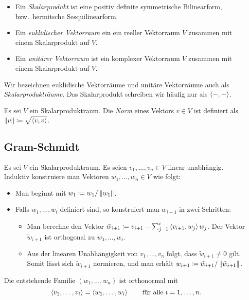 \begin{definition}
  \begin{itemize}
    \item
      Ein \emph{Skalarprodukt} ist eine positiv definite symmetrische Bilinearform, bzw.\ hermitsche Sesquilinearform.
    \item
      Ein \emph{euklidischer Vektorraum} ein ein reeller Vektorraum $V$ zusammen mit einem Skalarprodukt auf $V$.
    \item
      Ein \emph{unitärer Vektorraum} ist ein komplexer Vektorraum $V$ zusammen mit einem Skalarprodukt auf $V$.
  \end{itemize}
  Wir bezeichnen euklidische Vektorräume und unitäre Vektorräume auch als \emph{Skalarprodukträume}.
  Das Skalarprodukt schreiben wir häufig nur als $\left\langle -, - \right\rangle$.
\end{definition}


\begin{definition}
  Es sei $V$ ein Skalarproduktraum.
  Die \emph{Norm} eines Vektors $v \in V$ ist definiert als $\left\| v \right\| \coloneqq \sqrt{ \left\langle v, v \right\rangle }$.
\end{definition}





\subsection{Gram-Schmidt}

Es sei $V$ ein Skalarproduktraum.
Es seien $v_1, \dotsc, v_n \in V$ linear unabhängig.
Induktiv konstruiere man Vektoren $w_1, \dotsc, w_n \in V$ wie folgt:
\begin{itemize}
  \item
    Man beginnt mit $w_1 \coloneqq w_1 / \left\| w_1 \right\|$.
  \item
    Falls $w_1, \dotsc, w_i$ definiert sind, so konstruiert man $w_{i+1}$ in zwei Schritten:
    \begin{itemize}
      \item
        Man berechne den Vektor $\tilde{w}_{i+1} \coloneqq v_{i+1} - \sum_{j=1}^i \left\langle v_{i+1}, w_j \right\rangle w_j$.
        Der Vektor $\tilde{w}_{i+1}$ ist orthogonal zu $w_1, \dotsc, w_i$.
      \item
        Aus der linearen Unabhängigkeit von $v_1, \dotsc, v_n$ folgt, dass $\tilde{w}_{i+1} \neq 0$ gilt.
        Somit lässt sich $\tilde{w}_{i+1}$ normieren, und man erhält $w_{i+1} \coloneqq \tilde{w}_{i+1} / \left\| \tilde{w}_{i+1} \right\|$.
    \end{itemize}
\end{itemize}
Die entstehende Familie $(w_1, \dotsc, w_n)$ ist orthonormal mit
\[
    \left\langle v_1, \dotsc, v_i \right\rangle
  = \left\langle w_1, \dotsc, w_i \right\rangle
  \qquad
  \text{für alle $i = 1, \dotsc, n$}.
\]

